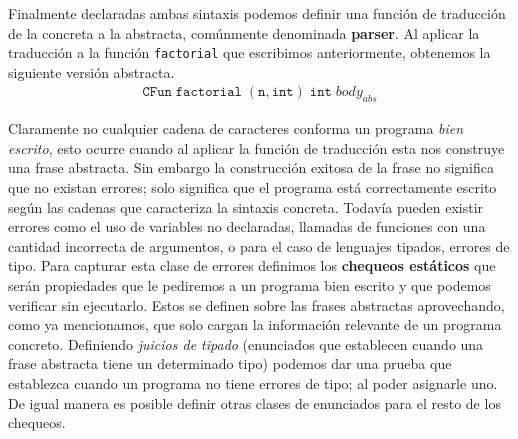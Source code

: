 Finalmente declaradas ambas sintaxis podemos definir una función de traducción de la concreta a la abstracta, comúnmente denominada \textbf{parser}.
Al aplicar la traducción a la función \texttt{factorial} que escribimos anteriormente, obtenemos la siguiente versión abstracta.
\begin{gather*}
\texttt{CFun} \; \texttt{factorial} \; ( \texttt{n}, \texttt{int} ) \; \texttt{int} \; body_{abs}
\end{gather*}

Claramente no cualquier cadena de caracteres conforma un programa \textit{bien escrito}, esto ocurre cuando al aplicar la función de traducción esta nos construye una frase abstracta.
Sin embargo la construcción exitosa de la frase no significa que no existan errores; solo significa que el programa está correctamente escrito según las cadenas que caracteriza la sintaxis concreta.
Todavía pueden existir errores como el uso de variables no declaradas, llamadas de funciones con una cantidad incorrecta de argumentos, o para el caso de lenguajes tipados, errores de tipo.
Para capturar esta clase de errores definimos los \textbf{chequeos estáticos} que serán propiedades que le pediremos a un programa bien escrito y que podemos verificar sin ejecutarlo.
Estos se definen sobre las frases abstractas aprovechando, como ya mencionamos, que solo cargan la información relevante de un programa concreto.
Definiendo \textit{juicios de tipado} (enunciados que establecen cuando una frase abstracta tiene un determinado tipo) podemos dar una prueba que establezca cuando un programa no tiene errores de tipo; al poder asignarle uno. De igual manera es posible definir otras clases de enunciados para el resto de los chequeos.

